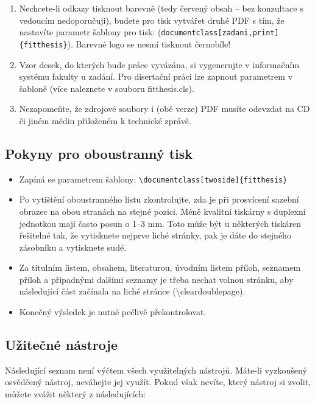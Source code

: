 \begin{enumerate}
  \item Nechcete-li odkazy tisknout barevně (tedy červený obsah -- bez konzultace s vedoucím nedoporučuji), budete pro tisk vytvářet druhé PDF s tím, že nastavíte parametr šablony pro tisk: (\verb|documentclass[zadani,print]{fitthesis}|).  Barevné logo se nesmí tisknout černobíle!
  \item Vzor desek, do kterých bude práce vyvázána, si vygenerujte v informačním systému fakulty u zadání. Pro disertační práci lze zapnout parametrem v šabloně (více naleznete v souboru fitthesis.cls).
  \item Nezapomeňte, že zdrojové soubory i (obě verze) PDF musíte odevzdat na CD či jiném médiu přiloženém k technické zprávě.
\end{enumerate}

\subsection*{Pokyny pro oboustranný tisk}
\begin{itemize}
\item Zapíná se parametrem šablony: \verb|\documentclass[twoside]{fitthesis}|
\item Po vytištění oboustranného listu zkontrolujte, zda je při prosvícení sazební obrazec na obou stranách na stejné pozici. Méně kvalitní tiskárny s duplexní jednotkou mají často posun o 1--3 mm. Toto může být u některých tiskáren řešitelné tak, že vytisknete nejprve liché stránky, pak je dáte do stejného zásobníku a vytisknete sudé.
\item Za titulním listem, obsahem, literaturou, úvodním listem příloh, seznamem příloh a případnými dalšími seznamy je třeba nechat volnou stránku, aby následující část začínala na liché stránce (\textbackslash cleardoublepage).
\item  Konečný výsledek je nutné pečlivě překontrolovat.
\end{itemize}


\subsection*{Užitečné nástroje}
\label{nastroje}

Následující seznam není výčtem všech využitelných nástrojů. Máte-li vyzkoušený osvědčený nástroj, neváhejte jej využít. Pokud však nevíte, který nástroj si zvolit, můžete zvážit některý z následujících:

